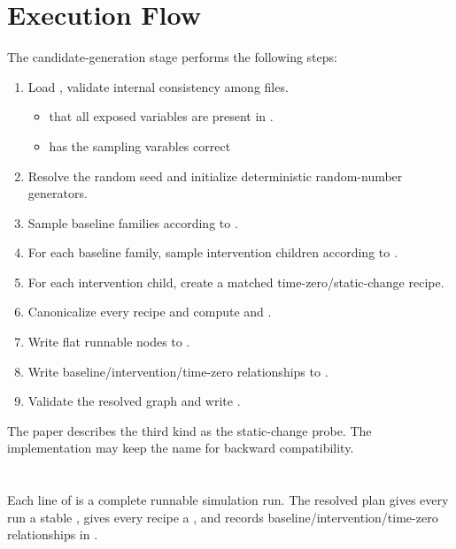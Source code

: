 \documentclass[11pt]{article}
\begin{document}
\section*{Execution Flow}

The candidate-generation stage performs the following steps:

\begin{enumerate}
\item Load ,  validate internal consistency among files.
\begin{itemize}
  \item that all exposed variables are present in .
  \item {} has the sampling varables correct
\end{itemize}
\item Resolve the random seed and initialize deterministic random-number generators.
\item Sample baseline families according to .
\item For each baseline family, sample intervention children according to .
\item For each intervention child, create a matched time-zero/static-change recipe.
\item Canonicalize every recipe and compute  and .
\item Write flat runnable nodes to .
\item Write baseline/intervention/time-zero relationships to .
\item Validate the resolved graph and write .
\end{enumerate}

The paper describes the third kind as the static-change probe.
The implementation may keep the name  for backward compatibility.

\section*{\texorpdfstring{}{run\_nodes.jsonl}}
\label{sec:candidate-generation-run-nodes}
Each line of  is a complete runnable simulation run.
The resolved plan gives every run a stable , gives every recipe a , and records baseline/intervention/time-zero relationships in .
\end{document}
